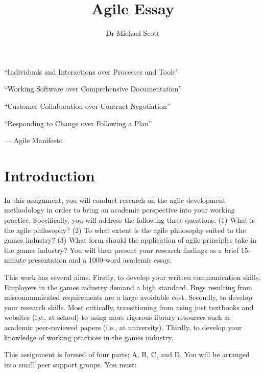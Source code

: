 \documentclass{../fal_assignment}
\title{Agile Essay}
\author{Dr Michael Scott}
\begin{document}
\maketitle

\begin{marginquote}
  ``Individuals and Interactions over Processes and Tools''
  
  ``Working Software over Comprehensive Documentation''
  
  ``Customer Collaboration over Contract Negotiation''
  
  ``Responding to Change over Following a Plan''
    
    --- Agile Manifesto
\end{marginquote}

%    
\section*{Introduction}

In this assignment, you will conduct research on the agile development methodology in order to bring an academic perspective into your working practice. Specifically, you will address the following three questions: (1) What is the agile philosophy? (2) To what extent is the agile philosophy suited to the games industry? (3) What form should the application of agile principles take in the games industry? You will then present your research findings as a brief 15-minute presentation and a 1000-word academic essay.

This work has several aims. Firstly, to develop your written communication skills. Employers in the games industry demand a high standard. Bugs resulting from miscommunicated requirements are a large avoidable cost. Secondly, to develop your research skills. Most critically, transitioning from using just textbooks and websites (i.e., at school) to using more rigorous library resources such as academic peer-reviewed papers (i.e., at university). Thirdly, to develop your knowledge of working practices in the games industry.

This assignment is formed of four parts: A, B, C, and D. You will be arranged into small peer support groups. You must:
\end{document}
